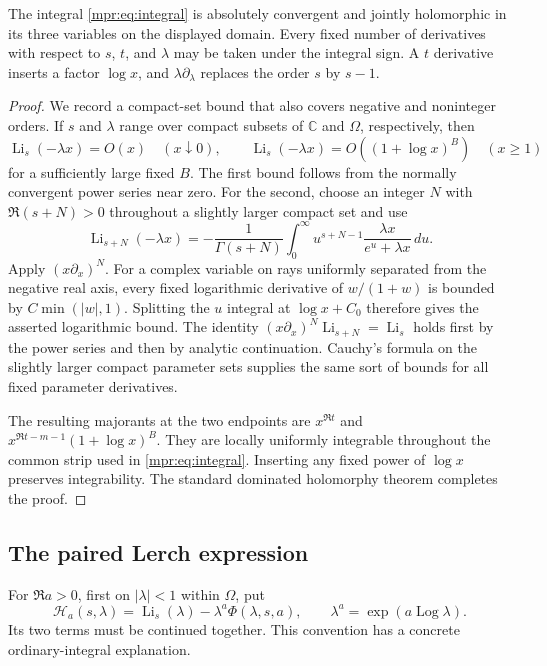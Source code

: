 \begin{lemma}\label{mpr:lem:holomorphic}
The integral \eqref{mpr:eq:integral} is absolutely convergent and jointly
holomorphic in its three variables on the displayed domain.  Every fixed
number of derivatives with respect to $s$, $t$, and $\lambda$ may be taken
under the integral sign.  A $t$ derivative inserts a factor $\log x$, and
$\lambda\partial_\lambda$ replaces the order $s$ by $s-1$.
\end{lemma}

\begin{proof}
We record a compact-set bound that also covers negative and noninteger
orders.  If $s$ and $\lambda$ range over compact subsets of $\mathbb C$
and $\Omega$, respectively, then
\[
 \operatorname{Li}_s(-\lambda x)=O(x)\quad(x\downarrow0),\qquad
 \operatorname{Li}_s(-\lambda x)=O((1+\log x)^B)\quad(x\ge1)
\]
for a sufficiently large fixed $B$.  The first bound follows from the
normally convergent power series near zero.  For the second, choose an
integer $N$ with $\Re(s+N)>0$ throughout a slightly larger compact set and
use
\[
 \operatorname{Li}_{s+N}(-\lambda x)
 =-\frac1{\Gamma(s+N)}\int_0^\infty
        u^{s+N-1}\frac{\lambda x}{e^u+\lambda x}\,du.
\]
Apply $(x\partial_x)^N$.  For a complex variable on rays uniformly
separated from the negative real axis, every fixed logarithmic derivative
of $w/(1+w)$ is bounded by $C\min(|w|,1)$.  Splitting the $u$ integral
at $\log x+C_0$ therefore gives the asserted logarithmic bound.
The identity $(x\partial_x)^N\operatorname{Li}_{s+N}
=\operatorname{Li}_s$ holds first by the power series and then by analytic
continuation.  Cauchy's formula on the slightly larger compact parameter
sets supplies the same sort of bounds for all fixed parameter derivatives.

The resulting majorants at the two endpoints are
$x^{\Re t}$ and $x^{\Re t-m-1}(1+\log x)^B$.  They are locally uniformly
integrable throughout the common strip used in
\eqref{mpr:eq:integral}.  Inserting any fixed power of $\log x$ preserves
integrability.  The standard dominated holomorphy theorem completes the
proof.
\end{proof}

\subsection{The paired Lerch expression}

For $\Re a>0$, first on $|\lambda|<1$ within $\Omega$, put
\begin{equation}\label{mpr:eq:Hdefinition}
 \mathcal H_a(s,\lambda)
 =\operatorname{Li}_s(\lambda)
        -\lambda^a\Phi(\lambda,s,a),
 \qquad \lambda^a=\exp(a\operatorname{Log}\lambda).
\end{equation}
Its two terms must be continued together.  This convention has a concrete
ordinary-integral explanation.

